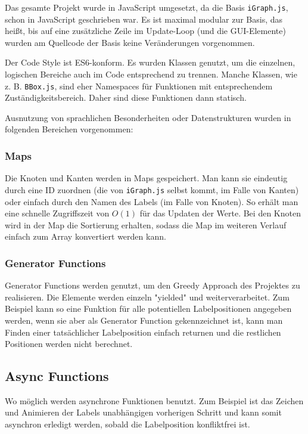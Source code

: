 %

Das gesamte Projekt wurde in JavaScript umgesetzt, da die Basis \texttt{iGraph.js}, schon in JavaScript geschrieben war.
Es ist maximal modular zur Basis, das heißt, bis auf eine zusätzliche Zeile im Update-Loop (und die GUI-Elemente) wurden am Quellcode der Basis keine Veränderungen vorgenommen.

Der Code Style ist ES6-konform. Es wurden Klassen genutzt, um die einzelnen, logischen Bereiche auch im Code entsprechend zu trennen.
Manche Klassen, wie z. B. \texttt{BBox.js}, sind eher Namespaces für Funktionen mit entsprechendem Zuständigkeitsbereich. Daher sind diese Funktionen dann statisch.

Ausnutzung von sprachlichen Besonderheiten oder Datenstrukturen wurden in folgenden Bereichen vorgenommen:

\subsubsection{Maps}
Die Knoten und Kanten werden in Maps gespeichert. Man kann sie eindeutig durch eine ID zuordnen (die von \texttt{iGraph.js} selbst kommt, im Falle von Kanten) oder einfach durch den Namen des Labels (im Falle von Knoten).
So erhält man eine schnelle Zugriffszeit von $O(1)$ für das Updaten der Werte. Bei den Knoten wird in der Map die Sortierung erhalten, sodass die Map im weiteren Verlauf einfach zum Array konvertiert werden kann.

\subsubsection{Generator Functions}
Generator Functions werden genutzt, um den Greedy Approach des Projektes zu realisieren.
Die Elemente werden einzeln "yielded" und weiterverarbeitet. Zum Beispiel kann so eine Funktion für alle potentiellen Labelpositionen angegeben werden,
wenn sie aber als Generator Function gekennzeichnet ist, kann man Finden einer tatsächlicher Labelposition einfach returnen und die restlichen Positionen werden nicht berechnet.

\subsection{Async Functions}
Wo möglich werden asynchrone Funktionen benutzt. Zum Beispiel ist das Zeichen und Animieren der Labels unabhängigen vorherigen Schritt und kann somit asynchron erledigt werden, sobald die Labelposition konfliktfrei ist.
